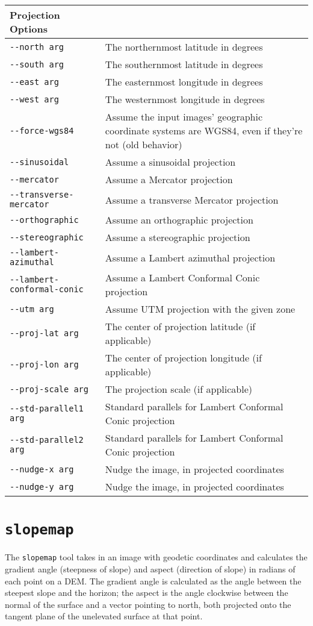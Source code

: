 \begin{longtable}{|l|p{9cm}|}
Projection Options\\ \hline
\verb#--north arg# & The northernmost latitude in degrees\\ \hline
\verb#--south arg# & The southernmost latitude in degrees\\ \hline
\verb#--east arg# & The easternmost longitude in degrees\\ \hline
\verb#--west arg# & The westernmost longitude in degrees\\ \hline
\verb#--force-wgs84# & Assume the input images' geographic coordinate systems are WGS84, even if they're not (old behavior)\\ \hline
\verb#--sinusoidal# & Assume a sinusoidal projection\\ \hline
\verb#--mercator# & Assume a Mercator projection\\ \hline
\verb#--transverse-mercator# & Assume a transverse Mercator projection\\ \hline
\verb#--orthographic# & Assume an orthographic projection\\ \hline
\verb#--stereographic# & Assume a stereographic projection\\ \hline
\verb#--lambert-azimuthal# & Assume a Lambert azimuthal projection\\ \hline
\verb#--lambert-conformal-conic# & Assume a Lambert Conformal Conic projection\\ \hline
\verb#--utm arg# & Assume UTM projection with the given zone\\ \hline
\verb#--proj-lat arg# & The center of projection latitude (if applicable)\\ \hline
\verb#--proj-lon arg# & The center of projection longitude (if applicable)\\ \hline
\verb#--proj-scale arg# & The projection scale (if applicable)\\ \hline
\verb#--std-parallel1 arg# & Standard parallels for Lambert Conformal Conic projection\\ \hline
\verb#--std-parallel2 arg# & Standard parallels for Lambert Conformal Conic projection\\ \hline
\verb#--nudge-x arg# & Nudge the image, in projected coordinates\\ \hline
\verb#--nudge-y arg# & Nudge the image, in projected coordinates\\ \hline
\end{longtable}


\section{{\tt slopemap}}\label{sec:slopemap} %
The \verb#slopemap# tool takes in an image with geodetic coordinates and calculates the gradient angle (steepness of slope) and aspect (direction of slope) in radians of each point on a DEM. The gradient angle is calculated as the angle between the steepest slope and the horizon; the aspect is the angle clockwise between the normal of the surface and a vector pointing to north, both projected onto the tangent plane of the unelevated surface at that point. 

